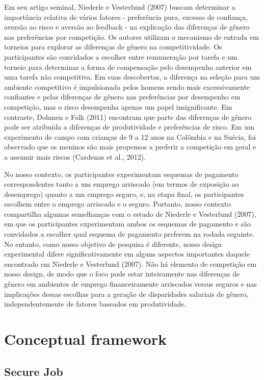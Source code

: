 \documentclass[a4paper,12pt]{article}[abntex2]
\begin{document}
Em seu artigo seminal, Niederle e Vesterlund (2007) buscam determinar a importância relativa de vários fatores - preferência pura, excesso de confiança, aversão ao risco e aversão ao feedback - na explicação das diferenças de gênero nas preferências por competição. Os autores utilizam o mecanismo de entrada em torneios para explorar as diferenças de gênero na competitividade. Os participantes são convidados a escolher entre remuneração por tarefa e um torneio para determinar a forma de compensação pelo desempenho anterior em uma tarefa não competitiva. Em suas descobertas, a diferença na seleção para um ambiente competitivo é impulsionada pelos homens sendo mais excessivamente confiantes e pelas diferenças de gênero nas preferências por desempenho em competição, mas o risco desempenha apenas um papel insignificante. Em contraste, Dohmen e Falk (2011) encontram que parte das diferenças de gênero pode ser atribuída a diferenças de produtividade e preferências de risco. Em um experimento de campo com crianças de 9 a 12 anos na Colômbia e na Suécia, foi observado que os meninos são mais propensos a preferir a competição em geral e a assumir mais riscos (Cardenas et al., 2012).

No nosso contexto, os participantes experimentam esquemas de pagamento correspondentes tanto a um emprego arriscado (em termos de exposição ao desemprego) quanto a um emprego seguro, e, na etapa final, os participantes escolhem entre o emprego arriscado e o seguro. Portanto, nosso contexto compartilha algumas semelhanças com o estudo de Niederle e Vesterlund (2007), em que os participantes experimentam ambos os esquemas de pagamento e são convidados a escolher qual esquema de pagamento preferem na rodada seguinte. No entanto, como nosso objetivo de pesquisa é diferente, nosso design experimental difere significativamente em alguns aspectos importantes daquele encontrado em Niederle e Vesterlund (2007). Não há elemento de competição em nosso design, de modo que o foco pode estar inteiramente nas diferenças de gênero em ambientes de emprego financeiramente arriscados versus seguros e nas implicações dessas escolhas para a geração de disparidades salariais de gênero, independentemente de fatores baseados em produtividade.

\section{\textbf{Conceptual framework}}

\subsection{\textbf{Secure Job}}
\end{document}
